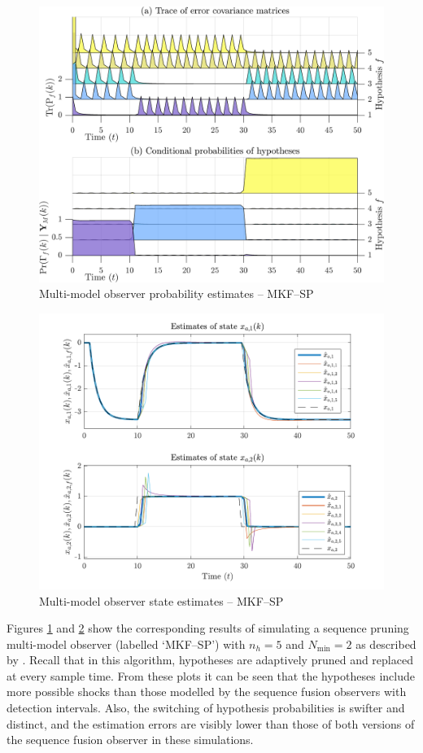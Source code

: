 \begin{figure}[htp]
	\centering
	\includegraphics[width=12cm]{images/rod_MKF_test_sim_MKF_SP_prob.png}
	\caption{Multi-model observer probability estimates – MKF--SP}
	\label{fig:rod-obs-sim-test-probs-SP}
\end{figure}
\begin{figure}[htp]
	\centering
	\includegraphics[width=13cm]{images/rod_MKF_test_sim_MKF_SP_x_est.pdf}
	\caption{Multi-model observer state estimates – MKF--SP}
	\label{fig:rod-obs-sim-test-x_est-SP}
\end{figure}
Figures \ref{fig:rod-obs-sim-test-probs-SP} and \ref{fig:rod-obs-sim-test-x_est-SP} show the corresponding results of simulating a sequence pruning multi-model observer (labelled `MKF--SP') with $n_h=5$ and $N_{\text{min}}=2$ as described by \cite{eriksson_classification_1996}. Recall that in this algorithm, hypotheses are adaptively pruned and replaced at every sample time. From these plots it can be seen that the hypotheses include more possible shocks than those modelled by the sequence fusion observers with detection intervals. Also, the switching of hypothesis probabilities is swifter and distinct, and the estimation errors are visibly lower than those of both versions of the sequence fusion observer in these simulations.


